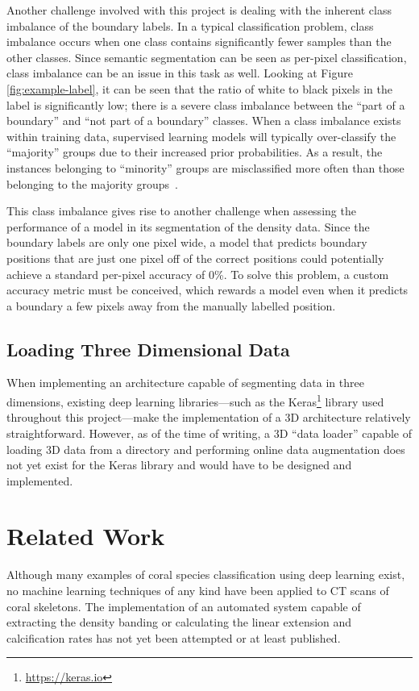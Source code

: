 Another challenge involved with this project is dealing with the inherent class imbalance of the boundary labels. In a typical classification problem, class imbalance occurs when one class contains significantly fewer samples than the other classes. Since semantic segmentation can be seen as per-pixel classification, class imbalance can be an issue in this task as well. Looking at Figure \ref{fig:example-label}, it can be seen that the ratio of white to black pixels in the label is significantly low; there is a severe class imbalance between the ``part of a boundary'' and ``not part of a boundary'' classes. When a class imbalance exists within training data, supervised learning models will typically over-classify the ``majority'' groups due to their increased prior probabilities. As a result, the instances belonging to ``minority'' groups are misclassified more often than those belonging to the majority groups~\cite{classimbalance}.

This class imbalance gives rise to another challenge when assessing the performance of a model in its segmentation of the density data. Since the boundary labels are only one pixel wide, a model that predicts boundary positions that are just one pixel off of the correct positions could potentially achieve a standard per-pixel accuracy of 0\%. To solve this problem, a custom accuracy metric must be conceived, which rewards a model even when it predicts a boundary a few pixels away from the manually labelled position.

\subsection{Loading Three Dimensional Data}

When implementing an architecture capable of segmenting data in three dimensions, existing deep learning libraries---such as the Keras\footnote{\url{https://keras.io}} library used throughout this project---make the implementation of a 3D architecture relatively straightforward. However, as of the time of writing, a 3D ``data loader'' capable of loading 3D data from a directory and performing online data augmentation does not yet exist for the Keras library and would have to be designed and implemented.

\section{Related Work}

Although many examples of coral species classification using deep learning exist, no machine learning techniques of any kind have been applied to CT scans of coral skeletons. The implementation of an automated system capable of extracting the density banding or calculating the linear extension and calcification rates has not yet been attempted or at least published.

